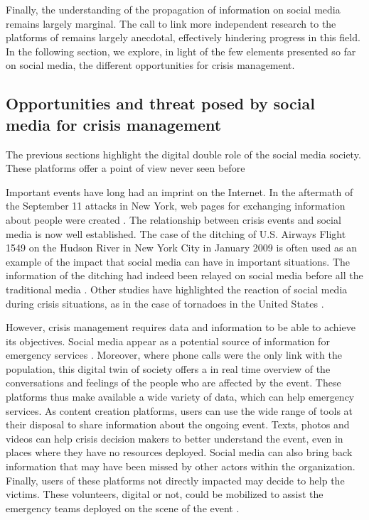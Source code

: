 Finally, the understanding of the propagation of information on social media remains largely marginal.
The call to link more independent research to the platforms of \cite{lazerScienceFakeNews2018} remains largely anecdotal, effectively hindering progress in this field.
In the following section, we explore, in light of the few elements presented so far on social media, the different opportunities for crisis management.

\subsection{Opportunities and threat posed by social media for crisis management}
The previous sections highlight the digital double role of the social media society.
These platforms offer a point of view never seen before

Important events have long had an imprint on the Internet.
In the aftermath of the September 11 attacks in New York, web pages for exchanging information about people were created \cite{palenCitizenCommunicationsCrisis2007}.
The relationship between crisis events and social media is now well established.
The case of the ditching of U.S. Airways Flight 1549 on the Hudson River in New York City in January 2009 is often used as an example of the impact that social media can have in important situations.
The information of the ditching had indeed been relayed on social media before all the traditional media \cite{murthyTwitter2018}.
Other studies have highlighted the reaction of social media during crisis situations, as in the case of tornadoes in the United States \cite{justinei.blanfordTweetingTornadoes2014}.

However, crisis management requires data and information to be able to achieve its objectives.
Social media appear as a potential source of information for emergency services \cite{tapiaSeekingTrustworthyTweet2011a}.
Moreover, where phone calls were the only link with the population, this digital twin of society offers a in real time overview of the conversations and feelings of the people who are affected by the event.
These platforms thus make available a wide variety of data, which can help emergency services.
As content creation platforms, users can use the wide range of tools at their disposal to share information about the ongoing event.
Texts, photos and videos can help crisis decision makers to better understand the event, even in places where they have no resources deployed.
Social media can also bring back information that may have been missed by other actors within the organization.
Finally, users of these platforms not directly impacted may decide to help the victims.
These volunteers, digital or not, could be mobilized to assist the emergency teams deployed on the scene of the event \cite{batardIntegrerContributionsCitoyennes2021}.

